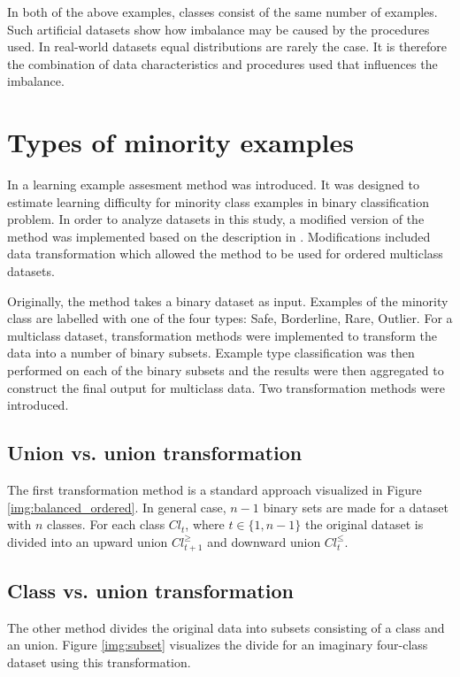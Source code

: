 \documentclass[12pt]{article}
\begin{document}
In both of the above examples, classes consist of the same number of examples. Such artificial datasets show how imbalance may be caused by the procedures used. In real-world datasets equal distributions are rarely the case. It is therefore the combination of data characteristics and procedures used that influences the imbalance.

\section{Types of minority examples}

In \cite{Napierala2016} a learning example assesment method was introduced. It was designed to estimate learning difficulty for minority class examples in binary classification problem. In order to analyze datasets in this study, a modified version of the method was implemented based on the description in \cite{Napierala2016}. Modifications included data transformation which allowed the method to be used for ordered multiclass datasets.

Originally, the method takes a binary dataset as input. Examples of the minority class are labelled with one of the four types: Safe, Borderline, Rare, Outlier. For a multiclass dataset, transformation methods were implemented to transform the data into a number of binary subsets. Example type classification was then performed on each of the binary subsets and the results were then aggregated to construct the final output for multiclass data. Two transformation methods were introduced.

\subsection{Union vs. union transformation}

The first transformation method is a standard approach visualized in Figure \ref{img:balanced_ordered}. In general case, $n - 1$ binary sets are made for a dataset with $n$ classes. For each class $Cl_t$, where $t \in \{1, n-1\}$ the original dataset is divided into  an upward union $Cl_{t + 1}^\geq$ and downward union $Cl_{t}^\leq$.

\subsection{Class vs. union transformation}

The other method divides the original data into subsets consisting of a class and an union. Figure \ref{img:subset} visualizes the divide for an imaginary four-class dataset using this transformation.
\end{document}
